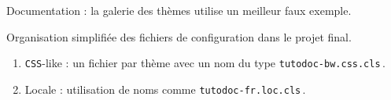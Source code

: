 \documentclass{tutodoc}
\begin{document}
\begin{tdocupdate}
	\item Documentation : la galerie des thèmes utilise un meilleur faux exemple.
\end{tdocupdate}



\begin{tdoctech}
	\item Organisation simplifiée des fichiers de configuration dans le projet final.
	\begin{enumerate}
		\item \texttt{CSS}-like : un fichier par thème avec un nom du type \texttt{tutodoc-bw.css.cls}\,.


		\item Locale : utilisation de noms comme \texttt{tutodoc-fr.loc.cls}\,.
	\end{enumerate}
\end{tdoctech}
\end{document}
